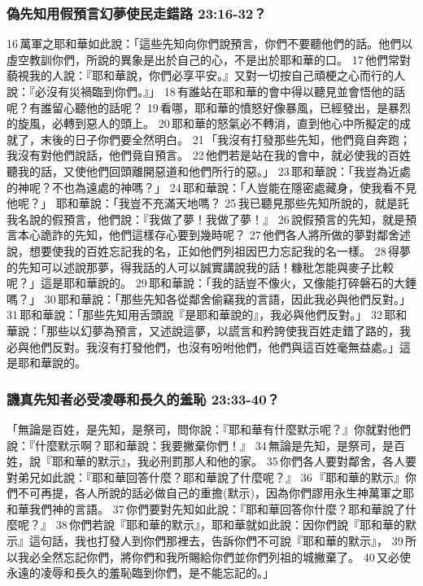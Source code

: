\subsubsection{偽先知用假預言幻夢使民走錯路 23:16-32？}
16 萬軍之耶和華如此說：「這些先知向你們說預言，你們不要聽他們的話。他們以虛空教訓你們，所說的異象是出於自己的心，不是出於耶和華的口。 17 他們常對藐視我的人說：『耶和華說，你們必享平安。』又對一切按自己頑梗之心而行的人說：『必沒有災禍臨到你們。』」 18 有誰站在耶和華的會中得以聽見並會悟他的話呢？有誰留心聽他的話呢？ 19 看哪，耶和華的憤怒好像暴風，已經發出，是暴烈的旋風，必轉到惡人的頭上。 20 耶和華的怒氣必不轉消，直到他心中所擬定的成就了，末後的日子你們要全然明白。 21 「我沒有打發那些先知，他們竟自奔跑；我沒有對他們說話，他們竟自預言。 22 他們若是站在我的會中，就必使我的百姓聽我的話，又使他們回頭離開惡道和他們所行的惡。」
23 耶和華說：「我豈為近處的神呢？不也為遠處的神嗎？」 
24 耶和華說：「人豈能在隱密處藏身，使我看不見他呢？」
耶和華說：「我豈不充滿天地嗎？ 25 我已聽見那些先知所說的，就是託我名說的假預言，他們說：『我做了夢！我做了夢！』 26 說假預言的先知，就是預言本心詭詐的先知，他們這樣存心要到幾時呢？ 27 他們各人將所做的夢對鄰舍述說，想要使我的百姓忘記我的名，正如他們列祖因巴力忘記我的名一樣。 28 得夢的先知可以述說那夢，得我話的人可以誠實講說我的話！糠秕怎能與麥子比較呢？」這是耶和華說的。 
29 耶和華說：「我的話豈不像火，又像能打碎磐石的大錘嗎？」 
30 耶和華說：「那些先知各從鄰舍偷竊我的言語，因此我必與他們反對。」 
31 耶和華說：「那些先知用舌頭說『是耶和華說的』，我必與他們反對。」 
32 耶和華說：「那些以幻夢為預言，又述說這夢，以謊言和矜誇使我百姓走錯了路的，我必與他們反對。我沒有打發他們，也沒有吩咐他們，他們與這百姓毫無益處。」這是耶和華說的。

\subsubsection{譏真先知者必受凌辱和長久的羞恥 23:33-40？}
「無論是百姓，是先知，是祭司，問你說：『耶和華有什麼默示呢？』你就對他們說：『什麼默示啊？耶和華說：我要撇棄你們！』 34 無論是先知，是祭司，是百姓，說『耶和華的默示』，我必刑罰那人和他的家。 35 你們各人要對鄰舍，各人要對弟兄如此說：『耶和華回答什麼？耶和華說了什麼呢？』 36 『耶和華的默示』你們不可再提，各人所說的話必做自己的重擔(默示)，因為你們謬用永生神萬軍之耶和華我們神的言語。 37 你們要對先知如此說：『耶和華回答你什麼？耶和華說了什麼呢？』 38 你們若說『耶和華的默示』，耶和華就如此說：因你們說『耶和華的默示』這句話，我也打發人到你們那裡去，告訴你們不可說『耶和華的默示』， 39 所以我必全然忘記你們，將你們和我所賜給你們並你們列祖的城撇棄了。 40 又必使永遠的凌辱和長久的羞恥臨到你們，是不能忘記的。」


